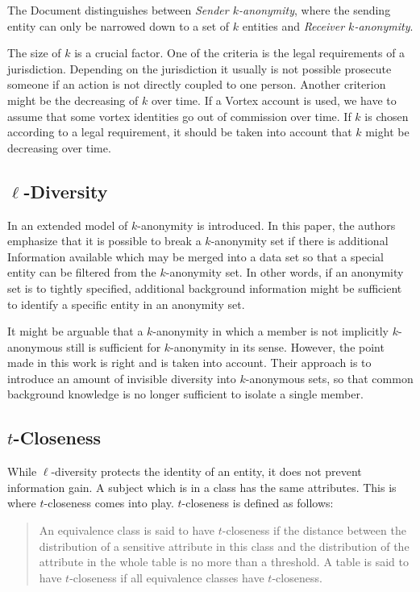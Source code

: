 The Document distinguishes between \textit{Sender $k$-anonymity}, where the sending entity can only be narrowed down to a set of $k$ entities and \textit{Receiver $k$-anonymity}. 

The size of $k$ is a crucial factor. One of the criteria is the legal requirements of a jurisdiction. Depending on the jurisdiction it usually is not possible prosecute someone if an action is not directly coupled to one person. Another criterion might be the decreasing of $k$ over time. If a Vortex account is used, we have to assume that some vortex identities go out of commission over time. If $k$ is chosen according to a legal requirement, it should be taken into account that $k$ might be decreasing over time.

\subsection{\texorpdfstring{$\ell$}{l}-Diversity}
In \cite{machanavajjhala2007diversity} an extended model of $k$-anonymity is introduced. In this paper, the authors emphasize that it is possible to break a $k$-anonymity set if there is additional Information available which may be merged into a data set so that a special entity can be filtered from the $k$-anonymity set. In other words, if an anonymity set is to tightly specified, additional background information might be sufficient to identify a specific entity in an anonymity set.

It might be arguable that a $k$-anonymity in which a member is not implicitly $k$-anonymous still is sufficient for $k$-anonymity in its sense. However, the point made in this work is right and is taken into account. Their approach is to introduce an amount of invisible diversity into $k$-anonymous sets, so that common background knowledge is no longer sufficient to isolate a single member.

\subsection{\texorpdfstring{$t$}{t}-Closeness}
While $\ell$-diversity protects the identity of an entity, it does not prevent information gain. A subject which is in a class has the same attributes. This is where $t$-closeness\cite{li2007t} comes into play. $t$-closeness is defined as follows:

\begin{quote}
	An equivalence class is said to have $t$-closeness if the distance between the distribution of a sensitive attribute in this class and the distribution of the attribute in the whole table is no more than a threshold. A table is said to have $t$-closeness if all equivalence classes have $t$-closeness.
\end{quote}

